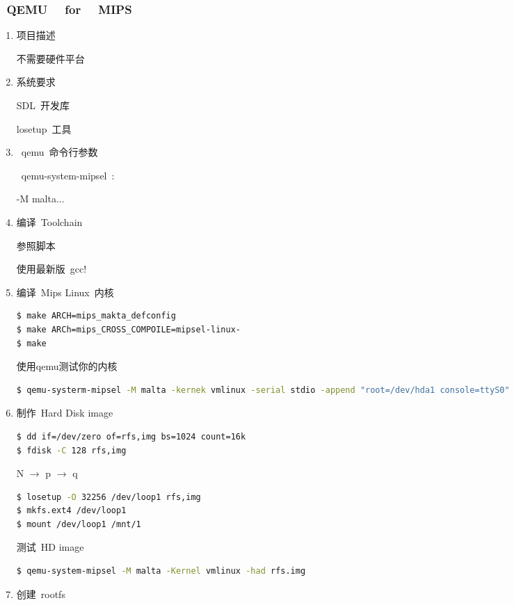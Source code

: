 \documentclass[a4paper,11pt]{article}
\begin{document}
\begin{CJK*}{UTF8}{gbsn}
\subsubsection{~QEMU~ ~for~ ~MIPS~}
\begin{enumerate}
\item 项目描述

不需要硬件平台

\item 系统要求

SDL~开发库

losetup~工具

\item ~qemu~命令行参数

~qemu-system-mipsel~:

-M malta...

\item 编译~Toolchain~

参照脚本

使用最新版~gcc!~

\item 编译~Mips Linux~内核
\begin{lstlisting}[language=sh, numbers=none]
$ make ARCH=mips_makta_defconfig
$ make ARCh=mips_CROSS_COMPOILE=mipsel-linux-
$ make
\end{lstlisting}
使用qemu测试你的内核

\begin{lstlisting}[language=sh, numbers=none]
$ qemu-systerm-mipsel -M malta -kernek vmlinux -serial stdio -append "root=/dev/hda1 console=ttyS0"
\end{lstlisting}

\item 制作~Hard Disk image~

\begin{lstlisting}[language=sh, numbers=none]
$ dd if=/dev/zero of=rfs,img bs=1024 count=16k
$ fdisk -C 128 rfs,img
\end{lstlisting}


N $\rightarrow$ p $\rightarrow$ q
\begin{lstlisting}[language=sh, numbers=none]
$ losetup -O 32256 /dev/loop1 rfs,img
$ mkfs.ext4 /dev/loop1
$ mount /dev/loop1 /mnt/1
\end{lstlisting}
测试~HD image~
\begin{lstlisting}[language=sh, numbers=none]
$ qemu-system-mipsel -M malta -Kernel vmlinux -had rfs.img
\end{lstlisting}
\item 创建~rootfs~


\end{enumerate}
\end{CJK*}
\end{document}
